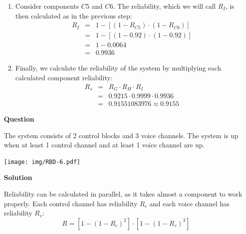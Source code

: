 \begin{examplebox}
\begin{enumerate}
        \item Consider components $C5$ and $C6$. The reliability, which we will call $R_{I}$, is then calculated as in the previous step:
        \begin{equation*}
            \begin{array}{rcl}
                R_{I} &=& 1 - \left[\left(1-R_{C5}\right) \cdot \left(1-R_{C6}\right)\right] \\ [.5em]
                &=& 1 - \left[\left(1 - 0.92\right) \cdot \left(1 - 0.92\right)\right] \\ [.5em]
                &=& 1 - 0.0064 \\ [.5em]
                &=& 0.9936
            \end{array}
        \end{equation*}

        \item Finally, we calculate the reliability of the system by multiplying each calculated component reliability:
        \begin{equation*}
            \begin{array}{rcl}
                R_{s} &=& R_{G} \cdot R_{H} \cdot R_{I} \\ [.5em]
                &=& 0.9215 \cdot 0.9999 \cdot 0.9936 \\ [.5em]
                &=& 0.91551083976 \approx 0.9155
            \end{array}
        \end{equation*}
    \end{enumerate}
\end{examplebox}

\begin{examplebox}
    \begin{flushleft}
        \textcolor{Green3}{ \textbf{Question}}
    \end{flushleft}
    The system consists of 2 control blocks and 3 voice channels. The system is up when at least 1 control channel and at least 1 voice channel are up.
    \begin{center}
        \texttt{[image: img/RBD-6.pdf]}
    \end{center}
    \begin{flushleft}
        \textcolor{Green3}{ \textbf{Solution}}
    \end{flushleft}
    Reliability can be calculated in parallel, as it takes almost a component to work properly. Each control channel has reliability $R_{c}$ and each voice channel has reliability $R_{v}$:
    \begin{equation*}
        R = \left[1 - \left(1 - R_{c}\right)^{2}\right] \cdot \left[1 - \left(1 - R_{v}\right)^{3}\right]
    \end{equation*}
\end{examplebox}

